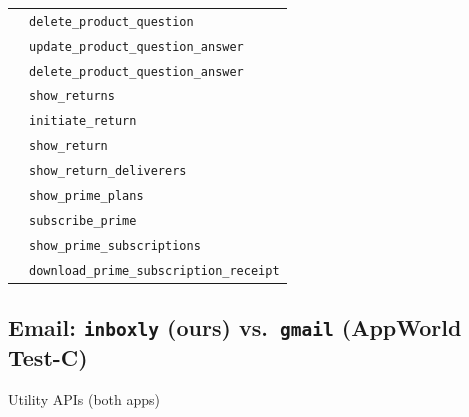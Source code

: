 \documentclass[11pt]{article}
\begin{document}
\begin{longtable}{ll}
 & \texttt{delete\_product\_question} \\
 & \texttt{update\_product\_question\_answer} \\
 & \texttt{delete\_product\_question\_answer} \\
 & \texttt{show\_returns} \\
 & \texttt{initiate\_return} \\
 & \texttt{show\_return} \\
 & \texttt{show\_return\_deliverers} \\
 & \texttt{show\_prime\_plans} \\
 & \texttt{subscribe\_prime} \\
 & \texttt{show\_prime\_subscriptions} \\
 & \texttt{download\_prime\_subscription\_receipt} \\
\end{longtable}

\subsection*{Email: \texttt{inboxly} (ours) vs.\ \texttt{gmail} (AppWorld Test-C)}

\colorbox{utilcolor}{\strut Utility APIs (both apps)}\\[6pt]
\end{document}
